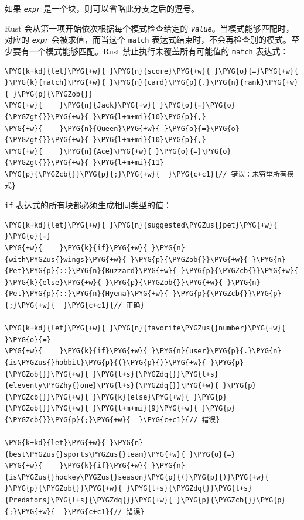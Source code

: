 如果 \emph{\texttt{expr}} 是一个块，则可以省略此分支之后的逗号。

Rust 会从第一项开始依次根据每个模式检查给定的 \emph{\texttt{value}}。当模式能够匹配时，对应的 \emph{\texttt{expr}} 会被求值，而当这个 \texttt{match} 表达式结束时，不会再检查别的模式。至少要有一个模式能够匹配。Rust 禁止执行未覆盖所有可能值的 \texttt{match} 表达式：

\begin{Verbatim}[commandchars=\\\{\},breaklines=true,breakanywhere=true,fontsize=\codefont,xleftmargin=17bp]
\PYG{k+kd}{let}\PYG{+w}{ }\PYG{n}{score}\PYG{+w}{ }\PYG{o}{=}\PYG{+w}{ }\PYG{k}{match}\PYG{+w}{ }\PYG{n}{card}\PYG{p}{.}\PYG{n}{rank}\PYG{+w}{ }\PYG{p}{\PYGZob{}}
\PYG{+w}{    }\PYG{n}{Jack}\PYG{+w}{ }\PYG{o}{=}\PYG{o}{\PYGZgt{}}\PYG{+w}{ }\PYG{l+m+mi}{10}\PYG{p}{,}
\PYG{+w}{    }\PYG{n}{Queen}\PYG{+w}{ }\PYG{o}{=}\PYG{o}{\PYGZgt{}}\PYG{+w}{ }\PYG{l+m+mi}{10}\PYG{p}{,}
\PYG{+w}{    }\PYG{n}{Ace}\PYG{+w}{ }\PYG{o}{=}\PYG{o}{\PYGZgt{}}\PYG{+w}{ }\PYG{l+m+mi}{11}
\PYG{p}{\PYGZcb{}}\PYG{p}{;}\PYG{+w}{  }\PYG{c+c1}{// 错误：未穷举所有模式}
\end{Verbatim}

\texttt{if} 表达式的所有块都必须生成相同类型的值：

\begin{Verbatim}[commandchars=\\\{\},breaklines=true,breakanywhere=true,fontsize=\codefont,xleftmargin=17bp]
\PYG{k+kd}{let}\PYG{+w}{ }\PYG{n}{suggested\PYGZus{}pet}\PYG{+w}{ }\PYG{o}{=}
\PYG{+w}{    }\PYG{k}{if}\PYG{+w}{ }\PYG{n}{with\PYGZus{}wings}\PYG{+w}{ }\PYG{p}{\PYGZob{}}\PYG{+w}{ }\PYG{n}{Pet}\PYG{p}{::}\PYG{n}{Buzzard}\PYG{+w}{ }\PYG{p}{\PYGZcb{}}\PYG{+w}{ }\PYG{k}{else}\PYG{+w}{ }\PYG{p}{\PYGZob{}}\PYG{+w}{ }\PYG{n}{Pet}\PYG{p}{::}\PYG{n}{Hyena}\PYG{+w}{ }\PYG{p}{\PYGZcb{}}\PYG{p}{;}\PYG{+w}{  }\PYG{c+c1}{// 正确}

\PYG{k+kd}{let}\PYG{+w}{ }\PYG{n}{favorite\PYGZus{}number}\PYG{+w}{ }\PYG{o}{=}
\PYG{+w}{    }\PYG{k}{if}\PYG{+w}{ }\PYG{n}{user}\PYG{p}{.}\PYG{n}{is\PYGZus{}hobbit}\PYG{p}{(}\PYG{p}{)}\PYG{+w}{ }\PYG{p}{\PYGZob{}}\PYG{+w}{ }\PYG{l+s}{\PYGZdq{}}\PYG{l+s}{eleventy\PYGZhy{}one}\PYG{l+s}{\PYGZdq{}}\PYG{+w}{ }\PYG{p}{\PYGZcb{}}\PYG{+w}{ }\PYG{k}{else}\PYG{+w}{ }\PYG{p}{\PYGZob{}}\PYG{+w}{ }\PYG{l+m+mi}{9}\PYG{+w}{ }\PYG{p}{\PYGZcb{}}\PYG{p}{;}\PYG{+w}{  }\PYG{c+c1}{// 错误}

\PYG{k+kd}{let}\PYG{+w}{ }\PYG{n}{best\PYGZus{}sports\PYGZus{}team}\PYG{+w}{ }\PYG{o}{=}
\PYG{+w}{    }\PYG{k}{if}\PYG{+w}{ }\PYG{n}{is\PYGZus{}hockey\PYGZus{}season}\PYG{p}{(}\PYG{p}{)}\PYG{+w}{ }\PYG{p}{\PYGZob{}}\PYG{+w}{ }\PYG{l+s}{\PYGZdq{}}\PYG{l+s}{Predators}\PYG{l+s}{\PYGZdq{}}\PYG{+w}{ }\PYG{p}{\PYGZcb{}}\PYG{p}{;}\PYG{+w}{  }\PYG{c+c1}{// 错误}
\end{Verbatim}

